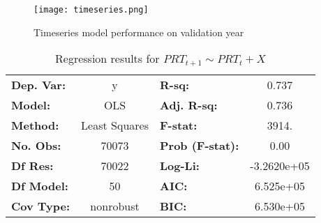 \documentclass[conference]{IEEEtran}
\begin{document}
\begin{figure}[h]
    \caption{\label{fig:ts} Timeseries model performance on validation year}
\centerline{\texttt{[image: timeseries.png]}}
\end{figure}


\begin{table}[h]
    \caption{\label{tab:ts1} Regression results for $PRT_{t+1} \sim PRT_t + X$}
\begin{center}
    \begin{tabular}{lclc}
\hline
\textbf{Dep. Var:}           &        y         & \textbf{  R-sq:         } &       0.737    \\
\textbf{Model:}                   &       OLS        & \textbf{  Adj. R-sq:    } &       0.736    \\
\textbf{Method:}                  &  Least Squares   & \textbf{  F-stat:       } &       3914.    \\
\textbf{No. Obs:}        &       70073               & \textbf{  Prob (F-stat):} &       0.00     \\
\textbf{Df Res:}            &       70022      & \textbf{  Log-Li:    } &  -3.2620e+05   \\
\textbf{Df Model:}                &          50      & \textbf{  AIC:               } &   6.525e+05    \\
\textbf{Cov Type:}         &    nonrobust     & \textbf{  BIC:               } &   6.530e+05    \\
\hline
\end{tabular}
\end{center}
\end{table}
\end{document}
